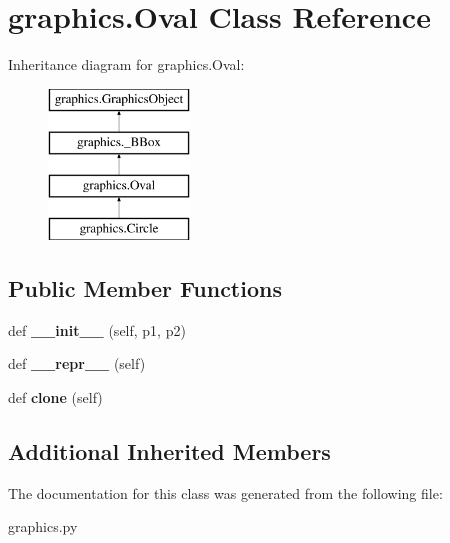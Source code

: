 \hypertarget{classgraphics_1_1_oval}{}\section{graphics.\+Oval Class Reference}
\label{classgraphics_1_1_oval}
Inheritance diagram for graphics.\+Oval\+:\begin{figure}[H]
\begin{center}
\leavevmode
\includegraphics[height=4.000000cm]{classgraphics_1_1_oval}
\end{center}
\end{figure}
\subsection*{Public Member Functions}
\begin{DoxyCompactItemize}
\item 
def {\bfseries \+\_\+\+\_\+init\+\_\+\+\_\+} (self, p1, p2)\hypertarget{classgraphics_1_1_oval_ac24c500a6feba342c3459fbfe5fee794}{}\label{classgraphics_1_1_oval_ac24c500a6feba342c3459fbfe5fee794}

\item 
def {\bfseries \+\_\+\+\_\+repr\+\_\+\+\_\+} (self)\hypertarget{classgraphics_1_1_oval_a7a3e92c1b76ffe75cbc18e49daa159ab}{}\label{classgraphics_1_1_oval_a7a3e92c1b76ffe75cbc18e49daa159ab}

\item 
def {\bfseries clone} (self)\hypertarget{classgraphics_1_1_oval_af914fb35dc36e36f1ba2f43679b8f0a1}{}\label{classgraphics_1_1_oval_af914fb35dc36e36f1ba2f43679b8f0a1}

\end{DoxyCompactItemize}
\subsection*{Additional Inherited Members}


The documentation for this class was generated from the following file\+:\begin{DoxyCompactItemize}
\item 
graphics.\+py\end{DoxyCompactItemize}
